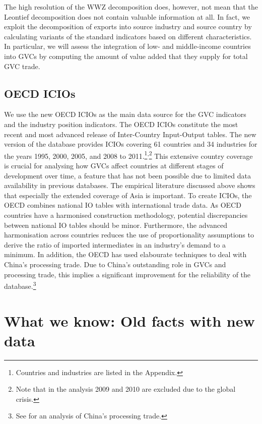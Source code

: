 \documentclass[11pt,a4paper]{article}
\begin{document}
The high resolution of the WWZ decomposition does, however, not mean that the Leontief decomposition does not contain valuable information at all. In fact, we exploit the decomposition of exports into source industry and source country by calculating variants of the standard indicators based on different characteristics. In particular, we will assess the integration of low- and middle-income countries into GVCs by computing the amount of value added that they supply for total GVC trade.


\subsection{OECD ICIOs}\label{sub:icios}
We use the new OECD ICIOs as the main data source for the GVC indicators and the industry position indicators. The OECD ICIOs constitute the most recent and most advanced release of Inter-Country Input-Output tables. The new version of the database provides ICIOs covering 61 countries and 34 industries for the years 1995, 2000, 2005, and 2008 to 2011.\footnote{Countries and industries are listed in the Appendix.}\textsuperscript{,}\footnote{Note that in the analysis 2009 and 2010 are excluded due to the global crisis.} This extensive country coverage is crucial for analysing how GVCs affect countries at different stages of development over time, a feature that has not been possible due to limited data availability in previous databases. The empirical literature discussed above shows that especially the extended coverage of Asia is important. To create ICIOs, the OECD combines national IO tables with international trade data. As OECD countries have a harmonised construction methodology, potential discrepancies between national IO tables should be minor. Furthermore, the advanced harmonisation across countries reduces the use of proportionality assumptions to derive the ratio of imported intermediates in an industry's demand to a minimum. In addition, the OECD has used elabourate techniques to deal with China's processing trade. Due to China's outstanding role in GVCs and processing trade, this implies a significant improvement for the reliability of the database.\footnote{See \citet{rokoetal12} for an analysis of China's processing trade.}



\section{What we know: Old facts with new data}\label{sec:basics}
\end{document}
